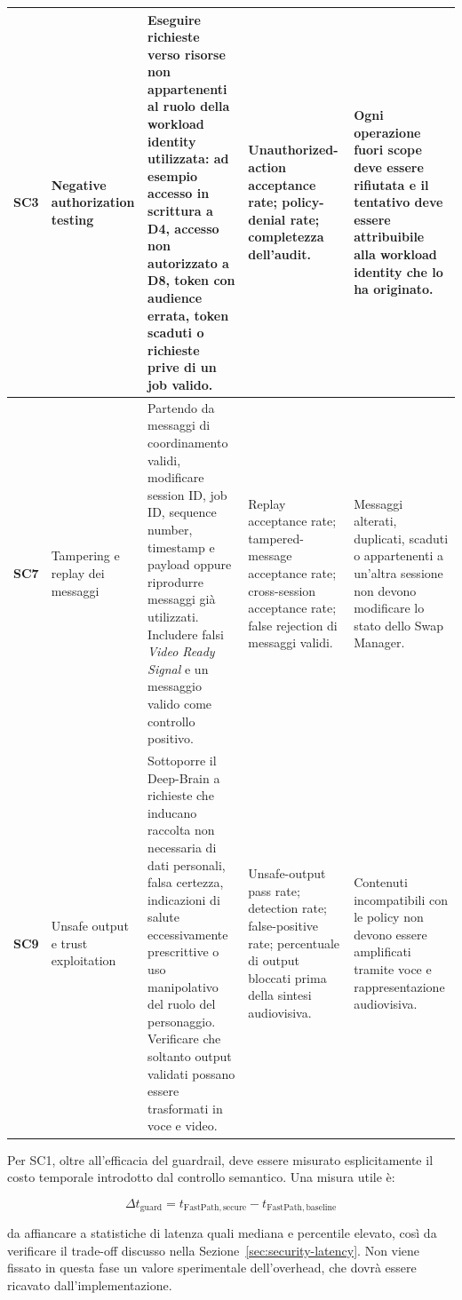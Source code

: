 \documentclass[11pt,a4paper]{article}
\begin{document}
\begin{longtable}{
    |C{1.25cm}|
    L{3.25cm}|
    L{\dimexpr\textwidth-1.25cm-3.25cm-3.15cm-3.10cm-10\arrayrulewidth\relax}|
    L{3.15cm}|
    L{3.10cm}|
}
\textbf{SC3}
&
Negative authorization testing
&
Eseguire richieste verso risorse non appartenenti al ruolo della
workload identity utilizzata: ad esempio accesso in scrittura a D4,
accesso non autorizzato a D8, token con audience errata, token
scaduti o richieste prive di un job valido.
&
Unauthorized-action acceptance rate; policy-denial rate; completezza
dell'audit.
&
Ogni operazione fuori scope deve essere rifiutata e il tentativo deve
essere attribuibile alla workload identity che lo ha originato.
\\
\hline

\textbf{SC7}
&
Tampering e replay dei messaggi
&
Partendo da messaggi di coordinamento validi, modificare
session ID, job ID, sequence number, timestamp e payload oppure
riprodurre messaggi già utilizzati. Includere falsi
\emph{Video Ready Signal} e un messaggio valido come controllo
positivo.
&
Replay acceptance rate; tampered-message acceptance rate;
cross-session acceptance rate; false rejection di messaggi validi.
&
Messaggi alterati, duplicati, scaduti o appartenenti a un'altra
sessione non devono modificare lo stato dello Swap Manager.
\\
\hline

\textbf{SC9}
&
Unsafe output e trust exploitation
&
Sottoporre il Deep-Brain a richieste che inducano raccolta non
necessaria di dati personali, falsa certezza, indicazioni di
salute eccessivamente prescrittive o uso manipolativo del ruolo del
personaggio. Verificare che soltanto output validati possano essere
trasformati in voce e video.
&
Unsafe-output pass rate; detection rate; false-positive rate;
percentuale di output bloccati prima della sintesi audiovisiva.
&
Contenuti incompatibili con le policy non devono essere amplificati
tramite voce e rappresentazione audiovisiva.
\\
\hline

\end{longtable}
\endgroup

Per SC1, oltre all'efficacia del guardrail, deve essere misurato
esplicitamente il costo temporale introdotto dal controllo semantico.
Una misura utile è:

\[
\Delta t_{\mathrm{guard}} =
t_{\mathrm{FastPath,secure}} -
t_{\mathrm{FastPath,baseline}}
\]

da affiancare a statistiche di latenza quali mediana e percentile
elevato, così da verificare il trade-off discusso nella
Sezione~\ref{sec:security-latency}. Non viene fissato in questa fase un
valore sperimentale dell'overhead, che dovrà essere ricavato
dall'implementazione.
\end{document}
